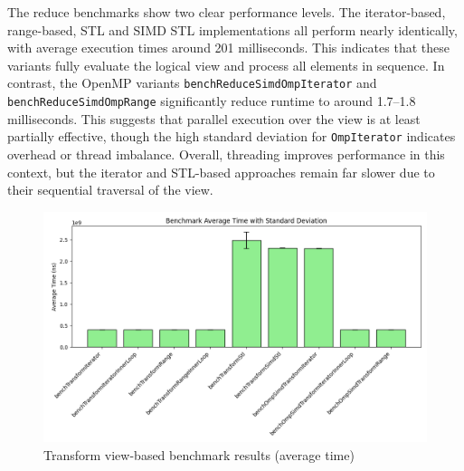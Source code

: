 The reduce benchmarks show two clear performance levels.
The iterator-based, range-based, STL and SIMD STL implementations all perform nearly identically, with average execution times around 201 milliseconds.
This indicates that these variants fully evaluate the logical view and process all elements in sequence.
In contrast, the OpenMP variants \texttt{benchReduceSimdOmpIterator} and \texttt{benchReduceSimdOmpRange} significantly reduce runtime to around 1.7--1.8 milliseconds.
This suggests that parallel execution over the view is at least partially effective, though the high standard deviation for \texttt{OmpIterator} indicates overhead or thread imbalance.
Overall, threading improves performance in this context, but the iterator and STL-based approaches remain far slower due to their sequential traversal of the view.

\begin{figure}[h!]
    \centering
    \includegraphics[width=0.9\linewidth]{img/simd_transformV_output.txt_ex02.png}
    \caption{Transform view-based benchmark results (average time)}
    \label{fig:simd_transformV_output}
\end{figure}


